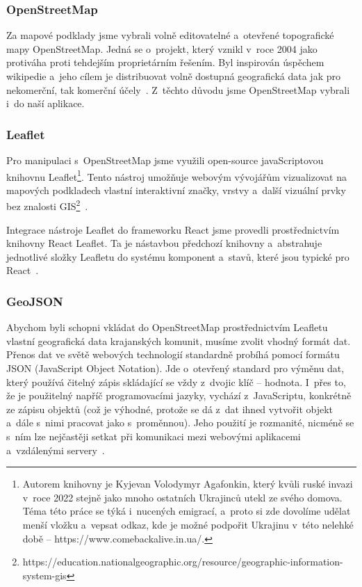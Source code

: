 \hypertarget{openstreetmap}{%
\subsubsection{OpenStreetMap}\label{openstreetmap}}

Za mapové podklady jsme vybrali volně editovatelné a~otevřené topografické mapy OpenStreetMap. Jedná se o~projekt, který vznikl v~roce 2004 jako protiváha proti tehdejším proprietárním řešením. Byl inspirován úspěchem wikipedie a~jeho cílem je distribuovat volně dostupná geografická data jak pro nekomerční, tak komerční účely~\parencite{open-street}. Z~těchto důvodu jsme OpenStreetMap vybrali i~do naší aplikace.

\hypertarget{leaflet}{%
\subsubsection{Leaflet}\label{leaflet}}

Pro manipulaci s~OpenStreetMap jsme využili open-source javaScriptovou knihovnu Leaflet\footnote{Autorem knihovny je Kyjevan Volodymyr Agafonkin, který kvůli ruské invazi v~roce 2022 stejně jako mnoho ostatních Ukrajinců utekl ze svého domova. Téma této práce se týká i~nucených emigrací, a~proto si zde dovolíme udělat menší vložku a~vepsat odkaz, kde je možné podpořit Ukrajinu v~této nelehké době – https://www.comebackalive.in.ua/.}. Tento nástroj umožňuje webovým vývojářům vizualizovat na mapových podkladech vlastní interaktivní značky, vrstvy a~další vizuální prvky bez znalosti GIS\footnote{https://education.nationalgeographic.org/resource/geographic-information-system-gis}~\parencite{leaflet}.

Integrace nástroje Leaflet do frameworku React jsme provedli prostřednictvím knihovny React Leaflet. Ta je nástavbou předchozí knihovny a~abstrahuje jednotlivé složky Leafletu do systému komponent a~stavů, které jsou typické pro React~\parencite{react-leaflet}.

\hypertarget{geojson}{%
\subsubsection{GeoJSON}\label{geojson}}

Abychom byli schopni vkládat do OpenStreetMap prostřednictvím Leafletu vlastní geografická data krajanských komunit, musíme zvolit vhodný formát dat. Přenos dat ve světě webových technologií standardně probíhá pomocí formátu JSON (JavaScript Object Notation). Jde o~otevřený standard pro výměnu dat, který používá čitelný zápis skládající se vždy z~dvojic klíč -- hodnota. I~přes to, že je použitelný napříč programovacími jazyky, vychází z~JavaScriptu, konkrétně ze zápisu objektů (což je výhodné, protože se dá z~dat ihned vytvořit objekt a~dále s~nimi pracovat jako s~proměnnou). Jeho použití je rozmanité, nicméně se s~ním lze nejčastěji setkat při komunikaci mezi webovými aplikacemi a~vzdálenými servery~\parencite{json}.

